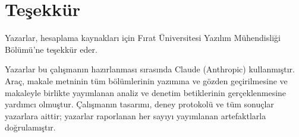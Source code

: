 \documentclass[journal]{IEEEtran}
\begin{document}
\section*{Teşekkür}
Yazarlar, hesaplama kaynakları için Fırat Üniversitesi Yazılım Mühendisliği Bölümü'ne teşekkür eder.

Yazarlar bu çalışmanın hazırlanması sırasında Claude (Anthropic) kullanmıştır. Araç, makale metninin tüm bölümlerinin yazımına ve gözden geçirilmesine ve makaleyle birlikte yayımlanan analiz ve denetim betiklerinin gerçeklenmesine yardımcı olmuştur. Çalışmanın tasarımı, deney protokolü ve tüm sonuçlar yazarlara aittir; yazarlar raporlanan her sayıyı yayımlanan artefaktlarla doğrulamıştır.



\end{document}
